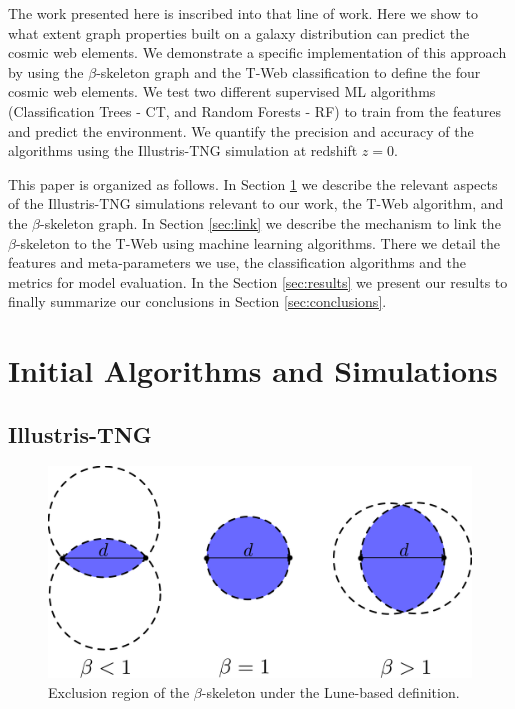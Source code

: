 \documentclass[usenatbib]{mnras}
\begin{document}
The work presented here is inscribed into that line of work.
Here we show to what extent graph properties built on a galaxy
distribution can predict the cosmic web elements.
We demonstrate a specific implementation of this approach by using
the $\beta$-skeleton graph \citep{Fang2019} and the T-Web
\citep{Forero-Romero2009} classification to define the four cosmic web elements.  
We test two different supervised ML
algorithms (Classification Trees - CT, and Random Forests - RF) 
to train from the features and predict the environment.
We quantify the precision and accuracy of the algorithms using the
Illustris-TNG simulation \citep{Nelson2015} at redshift $z=0$.

This paper is organized as follows. 
In Section \ref{sec:init} we describe the relevant aspects of the Illustris-TNG
simulations relevant to our work, the T-Web algorithm,
and the $\beta$-skeleton graph.
In Section \ref{sec:link} we describe the mechanism to link the
$\beta$-skeleton to the T-Web using machine learning algorithms.
There we detail the features and meta-parameters we use, the
classification algorithms and the metrics for model evaluation.  
In the Section \ref{sec:results} we present our results
to finally summarize our conclusions in Section
\ref{sec:conclusions}.


\section{Initial Algorithms and Simulations}\label{sec:init}

\subsection{Illustris-TNG}


\begin{figure}
\centering
 \includegraphics[scale=0.18]{Figs/p_beta.pdf}
 \caption{Exclusion region of the $\beta$-skeleton under the Lune-based definition.}  
 \label{fig:beta}
\end{figure}
\end{document}
